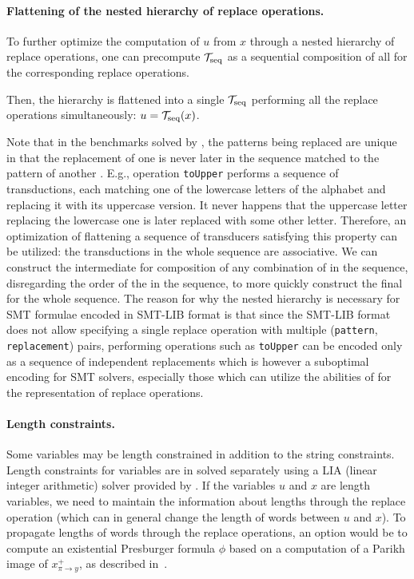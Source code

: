 \paragraph{Flattening of the nested hierarchy of replace operations.}
To further optimize the computation of $u$ from $x$ through a nested hierarchy of replace operations, one can precompute $\mathcal{T}_\text{seq}$ as a sequential composition of all \nfts for the corresponding replace operations.

Then, the hierarchy is flattened into a single $\mathcal{T}_\text{seq}$ performing all the replace operations simultaneously: $u = \mathcal{T}_\text{seq}(x)$.

Note that in the benchmarks solved by \noodler, the patterns being replaced are unique in that the replacement of one \nft is never later in the sequence matched to the pattern of another \nft.
E.g., operation \texttt{toUpper} performs a sequence of transductions, each matching one of the lowercase letters of the alphabet and replacing it with its uppercase version.
It never happens that the uppercase letter replacing the lowercase one is later replaced with some other letter.
Therefore, an optimization of flattening a sequence of transducers satisfying this property can be utilized: the transductions in the whole sequence are associative.
We can construct the intermediate \nfts for composition of any combination of \nfts in the sequence, disregarding the order of the \nfts in the sequence, to more quickly construct the final \nfts for the whole sequence.
The reason for why the nested hierarchy is necessary for SMT formulae encoded in SMT-LIB format is that since the SMT-LIB format does not allow specifying a single replace operation with multiple (\texttt{pattern}, \texttt{replacement}) pairs, performing operations such as \texttt{toUpper} can be encoded only as a sequence of independent replacements which is however a suboptimal encoding for SMT solvers, especially those which can utilize the abilities of \nfts for the representation of replace operations.

\paragraph{Length constraints.}
Some variables may be length constrained in addition to the string constraints.
Length constraints for variables are in \noodler solved separately using a LIA (linear integer arithmetic) solver provided by \ziii.
If the variables $u$ and $x$ are length variables, we need to maintain the information about lengths through the replace operation (which can in general change the length of words between $u$ and $x$).
To propagate lengths of words through the replace operations, an option would be to compute an existential Presburger formula $\phi$ based on a computation of a Parikh image of $x^{+}_{\pi \rightarrow y}$, as described in~\cite{ChainFree}.

